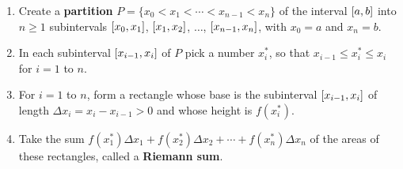 \begin{enumerate}[\bfseries 1.]
 \item Create a \textbf{partition} $P = \lbrace x_0 < x_1 < \cdots < x_{n-1}
  < x_n \rbrace$ of the interval $\lbrack a,b \rbrack$ into $n \ge 1$ subintervals
  $\lbrack x_0,x_1 \rbrack$, $\lbrack x_1,x_2 \rbrack$, $\ldots$, $\lbrack x_{n-1},x_n \rbrack$, with
  $x_0 = a$ and $x_n = b$.
 \item In each subinterval $\lbrack x_{i-1},x_i \rbrack$ of $P$ pick a
  number $x_i^*$, so that $x_{i-1} \le x_i^* \le x_i$ for $i=1$ to $n$.
 \item For $i=1$ to $n$, form a rectangle whose base is the subinterval
  $\lbrack x_{i-1},x_i \rbrack$ of length $\Delta x_i = x_i - x_{i-1} > 0$ and whose
  height is $f(x_i^*)$.
 \item Take the sum $f(x_1^*) \Delta x_1 + f(x_2^*) \Delta x_2 + \cdots +
  f(x_n^*) \Delta x_n$ of the areas of these rectangles, called a
  \textbf{Riemann sum}.


\end{enumerate}
